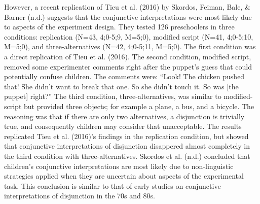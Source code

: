 \documentclass[oneside]{report}
\theoremstyle{definition}
\theoremstyle{definition}
\theoremstyle{definition}
\theoremstyle{remark}
\begin{document}
However, a recent replication of Tieu et al. (2016) by Skordos, Feiman,
Bale, \& Barner (n.d.) suggests that the conjunctive interpretations
were most likely due to aspects of the experiment design. They tested
126 preschoolers in three conditions: replication (N=43, 4;0-5;9,
M=5;0), modified script (N=41, 4;0-5;10, M=5;0), and three-alternatives
(N=42, 4;0-5;11, M=5;0). The first condition was a direct replication of
Tieu et al. (2016). The second condition, modified script, removed some
experimenter comments right after the puppet's guess that could
potentially confuse children. The comments were: ``Look! The chicken
pushed that! She didn't want to break that one. So she didn't touch it.
So was {[}the puppet{]} right?'' The third condition,
three-alternatives, was similar to modified-script but provided three
objects; for example a plane, a bus, and a bicycle. The reasoning was
that if there are only two alternatives, a disjunction is trivially
true, and consequently children may consider that unacceptable. The
results replicated Tieu et al. (2016)'s findings in the replication
condition, but showed that conjunctive interpretations of disjunction
disappered almost completely in the third condition with
three-alternatives. Skordos et al. (n.d.) concluded that children's
conjunctive interpretations are most likely due to non-linguistic
strategies applied when they are uncertain about aspects of the
experimental task. This conclusion is similar to that of early studies
on conjunctive interpretations of disjunction in the 70s and 80s.
\end{document}
